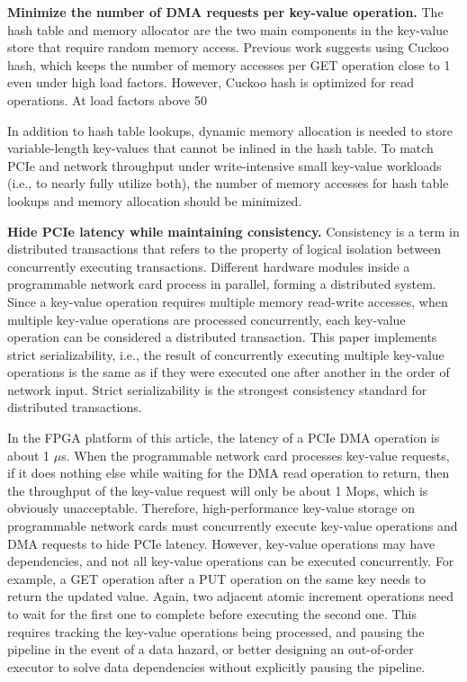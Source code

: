 {{\textbf{Minimize the number of DMA requests per key-value operation.} The hash table and memory allocator are the two main components in the key-value store that require random memory access. Previous work suggests using Cuckoo hash, which keeps the number of memory accesses per GET operation close to 1 even under high load factors. However, Cuckoo hash is optimized for read operations. At load factors above 50%

In addition to hash table lookups, dynamic memory allocation is needed to store variable-length key-values that cannot be inlined in the hash table. To match PCIe and network throughput under write-intensive small key-value workloads (i.e., to nearly fully utilize both), the number of memory accesses for hash table lookups and memory allocation should be minimized.

\textbf{Hide PCIe latency while maintaining consistency.} Consistency is a term in distributed transactions that refers to the property of logical isolation between concurrently executing transactions. Different hardware modules inside a programmable network card process in parallel, forming a distributed system. Since a key-value operation requires multiple memory read-write accesses, when multiple key-value operations are processed concurrently, each key-value operation can be considered a distributed transaction. This paper implements strict serializability, i.e., the result of concurrently executing multiple key-value operations is the same as if they were executed one after another in the order of network input. Strict serializability is the strongest consistency standard for distributed transactions.

In the FPGA platform of this article, the latency of a PCIe DMA operation is about 1 $\mu$s. When the programmable network card processes key-value requests, if it does nothing else while waiting for the DMA read operation to return, then the throughput of the key-value request will only be about 1 Mops, which is obviously unacceptable.
Therefore, high-performance key-value storage on programmable network cards must concurrently execute key-value operations and DMA requests to hide PCIe latency.
However, key-value operations may have dependencies, and not all key-value operations can be executed concurrently.
For example, a GET operation after a PUT operation on the same key needs to return the updated value.
Again, two adjacent atomic increment operations need to wait for the first one to complete before executing the second one.
This requires tracking the key-value operations being processed, and pausing the pipeline in the event of a data hazard, or better designing an out-of-order executor to solve data dependencies without explicitly pausing the pipeline.


}}
